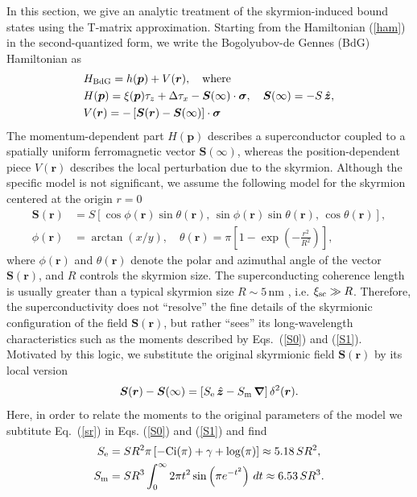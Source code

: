 \documentclass[twocolumn,showpacs,floatfix,longbibliography]{revtex4-1}
\begin{document}
In this section, we give an analytic treatment of the skyrmion-induced bound states using the T-matrix approximation. Starting from the Hamiltonian (\ref{ham}) in the second-quantized form, we write the Bogolyubov-de Gennes (BdG) Hamiltonian as 
\begin{align}
	& H_{\rm BdG} = h(\bm p) + V(\bm r),\quad {\rm where}  \label{hbdg} \\
& H(\bm p) = \xi(\bm p)\tau_z+\Delta \tau_x - \bm S(\infty)\cdot\bm\sigma,\quad \bm S(\infty) = -S\,\hat{\bm z}, \nonumber\\
& V(\bm r) = -\left[ \bm S(\bm r)-\bm S(\infty)\right]\cdot\bm\sigma \label{v0}
\end{align}
The momentum-dependent part $H(\bm p)$ describes a superconductor coupled to a spatially uniform ferromagnetic vector $\bm S(\infty)$, whereas the position-dependent piece $V(\bm r)$ describes the local perturbation due to the skyrmion. Although the specific model is not significant, we assume the following model for the skyrmion centered at the origin $r=0$
\begin{align}
	\bm S(\bm r) &= S\left[ \cos\phi(\bm r) \sin\theta(\bm r),\, \sin\phi(\bm r)\sin\theta(\bm r),\,\cos\theta(\bm r)\right], \nonumber \\   
	\phi(\bm r) &= \arctan(x/y),\quad \theta(\bm r) = \pi \left[ 1-\exp\left( -\frac{r^2}{R^2} \right) \right], 	\label{sr}
\end{align}
where $\phi(\bm r)$ and $\theta(\bm r)$ denote the polar and azimuthal angle of the vector $\bm S(\bm r)$, and $R$ controls the skyrmion size. The superconducting coherence length is usually greater than a typical skyrmion size $R\sim 5$\,nm \cite{Heinze2011,Romming2013,Bergmann2014,Brede2014,Sonntag2014,vonBergmann2015,Romming2015}, i.e. $\xi_{\rm sc}\gg R$. Therefore, the superconductivity does not ``resolve'' the fine details of the skyrmionic configuration of the field  $\bm S(\bm r)$, but rather ``sees'' its long-wavelength characteristics such as the moments described by Eqs.~(\ref{S0}) and (\ref{S1}). Motivated by this logic, we substitute the original skyrmionic field $\bm S(\bm r)$ by its local version 
\begin{equation}
	\bm S(\bm r) - \bm S(\infty) = \left[ S_{\rm e}\, \hat{\bm z} - S_{\rm m}\, \bm \nabla\right] \delta^2(\bm r).
	\label{S}
\end{equation}
Here, in order to relate the moments to the original parameters of the model we subtitute Eq.~(\ref{sr}) in Eqs. (\ref{S0}) and (\ref{S1}) and find 
\begin{align}
	S_{\rm e} &= SR^2 \pi  \left [-\text{Ci}(\pi )+\gamma +\log (\pi )\right] \approx 5.18\, SR^2, \\
	S_{\rm m} &= SR^3 \int_0^{\infty } 2 \pi  t^2 \sin \left(\pi  e^{-t^2}\right) \, dt \approx 6.53\, SR^3.
\end{align}
\end{document}
